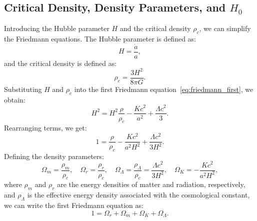 \subsection[Critical Density, Density Parameters, and H0]{Critical Density, Density Parameters, and $H_0$}
Introducing the Hubble parameter \( H \) and the critical density \( \rho_c \), we can simplify the Friedmann equations. The Hubble parameter is defined as:
\begin{equation}
    H = \frac{\dot{a}}{a},
    \label{eq:hubble_parameter}
\end{equation}
and the critical density is defined as:
\begin{equation}
    \rho_c = \frac{3 H^2}{8\pi G}.
    \label{eq:critical_density}
\end{equation}
Substituting \( H \) and \( \rho_c \) into the first Friedmann equation~\eqref{eq:friedmann_first}, we obtain:
\begin{equation}
    H^2 = H^2 \frac{\rho}{\rho_c} - \frac{K c^2}{a^2} + \frac{\Lambda c^2}{3}.
    \label{eq:friedmann_with_critical_density}
\end{equation}
Rearranging terms, we get:
\begin{equation}
    1 = \frac{\rho}{\rho_c} - \frac{K c^2}{a^2 H^2} + \frac{\Lambda c^2}{3 H^2}.
    \label{eq:friedmann_normalized}
\end{equation}
Defining the density parameters:
\begin{equation}
    \Omega_m = \frac{\rho_m}{\rho_c}, \quad \Omega_r = \frac{\rho_r}{\rho_c}, \quad \Omega_\Lambda = \frac{\rho_\Lambda}{\rho_c} = \frac{\Lambda c^2}{3 H^2}, \quad \Omega_K = -\frac{K c^2}{a^2 H^2},
    \label{eq:density_parameters}
\end{equation}
where \( \rho_m \) and \( \rho_r \) are the energy densities of matter and radiation, respectively, and \( \rho_\Lambda \) is the effective energy density associated with the cosmological constant, we can write the first Friedmann equation as:
\begin{equation}
    1 = \Omega_r + \Omega_m + \Omega_K + \Omega_\Lambda.
    \label{eq:friedmann_density_parameters}
\end{equation}


